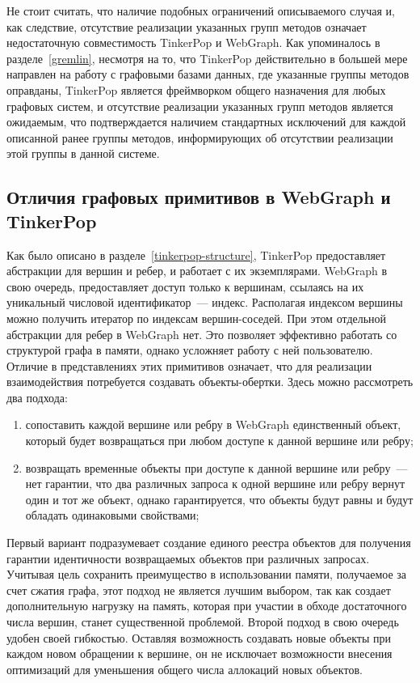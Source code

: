 \documentclass[times,specification,annotation]{itmo-student-thesis}
\begin{document}
Не стоит считать, что наличие подобных ограничений описываемого случая и, как следствие, отсутствие реализации указанных групп методов означает недостаточную совместимость TinkerPop и WebGraph. Как упоминалось в разделе~\ref{gremlin}, несмотря на то, что TinkerPop действительно в большей мере направлен на работу с графовыми базами данных, где указанные группы методов оправданы, TinkerPop является фреймворком общего назначения для любых графовых систем, и отсутствие реализации указанных групп методов является ожидаемым, что подтверждается наличием стандартных исключений для каждой описанной ранее группы методов, информирующих об отсутствии реализации этой группы в данной системе.

\subsection{Отличия графовых примитивов в WebGraph и TinkerPop}

Как было описано в разделе~\ref{tinkerpop-structure}, TinkerPop предоставляет абстракции для вершин и ребер, и работает с их экземплярами. WebGraph в свою очередь, предоставляет доступ только к вершинам, ссылаясь на их уникальный числовой идентификатор~--- индекс. Располагая индексом вершины можно получить итератор по индексам вершин-соседей. При этом отдельной абстракции для ребер в WebGraph нет. Это позволяет эффективно работать со структурой графа в памяти, однако усложняет работу с ней пользователю. Отличие в представлениях этих примитивов означает, что для реализации взаимодействия потребуется создавать объекты-обертки. Здесь можно рассмотреть два подхода:
\begin{enumerate}
    \item сопоставить каждой вершине или ребру в WebGraph единственный объект, который будет возвращаться при любом доступе к данной вершине или ребру;
    \item возвращать временные объекты при доступе к данной вершине или ребру~--- нет гарантии, что два различных запроса к одной вершине или ребру вернут один и тот же объект, однако гарантируется, что объекты будут равны и будут обладать одинаковыми свойствами;
\end{enumerate}

Первый вариант подразумевает создание единого реестра объектов для получения гарантии идентичности возвращаемых объектов при различных запросах. Учитывая цель сохранить преимущество в использовании памяти, получаемое за счет сжатия графа, этот подход не является лучшим выбором, так как создает дополнительную нагрузку на память, которая при участии в обходе достаточного числа вершин, станет существенной проблемой.
Второй подход в свою очередь удобен своей гибкостью. Оставляя возможность создавать новые объекты при каждом новом обращении к вершине, он не исключает возможности внесения оптимизаций для уменьшения общего числа аллокаций новых объектов.
\end{document}
